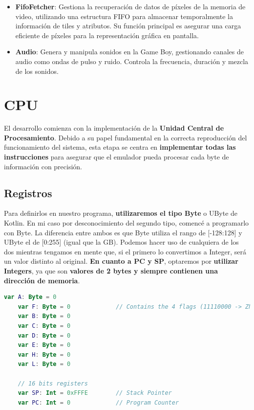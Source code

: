 \begin{itemize}
    \item \textbf{FifoFetcher}: Gestiona la recuperación de datos de píxeles de la memoria de video, utilizando una estructura FIFO para almacenar temporalmente la información de tiles y atributos. Su función principal es asegurar una carga eficiente de píxeles para la representación gráfica en pantalla.
    \item \textbf{Audio}: Genera y manipula sonidos en la Game Boy, gestionando canales de audio como ondas de pulso y ruido. Controla la frecuencia, duración y mezcla de los sonidos.
\end{itemize}

\section{CPU}

El desarrollo comienza con la implementación de la \textbf{Unidad Central de Procesamiento}. Debido a su papel fundamental en la correcta reproducción del funcionamiento del sistema, esta etapa se centra en \textbf{implementar todas las instrucciones} para asegurar que el emulador pueda procesar cada byte de información con precisión.

\subsection{Registros}
Para definirlos en nuestro programa, \textbf{utilizaremos el tipo Byte} o UByte de Kotlin. En mi caso por desconocimiento del segundo tipo, comencé a programarlo con Byte. La diferencia entre ambos es que Byte utiliza el rango de [-128:128] y UByte el de [0:255] (igual que la GB). Podemos hacer uso de cualquiera de los dos mientras tengamos en mente que, si el primero lo convertimos a Integer, será un valor distinto al original. \textbf{En cuanto a PC y SP}, optaremos por \textbf{utilizar Integers}, ya que son \textbf{valores de 2 bytes y siempre contienen una dirección de memoria}.

\begin{lstlisting}[language=Kotlin, caption={Declaración de Registros}, label={code:kotlinregistros}]
    var A: Byte = 0
    var F: Byte = 0             // Contains the 4 flags (11110000 -> ZNHC0000)
    var B: Byte = 0
    var C: Byte = 0
    var D: Byte = 0
    var E: Byte = 0
    var H: Byte = 0
    var L: Byte = 0

    // 16 bits registers
    var SP: Int = 0xFFFE        // Stack Pointer
    var PC: Int = 0             // Program Counter
\end{lstlisting}

